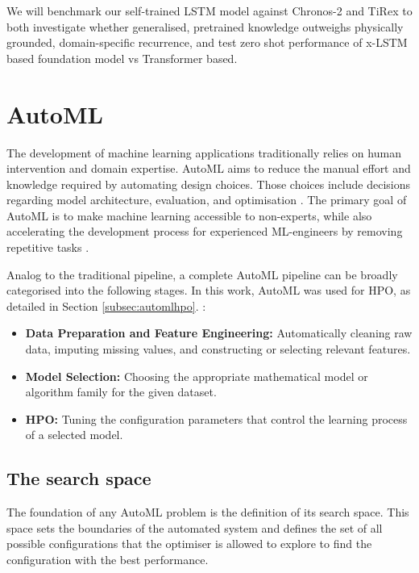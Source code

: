     
   We will benchmark our self-trained \ac{LSTM} model against Chronos-2 and TiRex to both investigate whether generalised, pretrained knowledge outweighs physically grounded, domain-specific recurrence, and test zero shot performance of \ac{x-LSTM} based foundation model vs Transformer based.
    

\section{AutoML}


The development of machine learning applications traditionally relies on human intervention and domain expertise. \ac{AutoML} aims to reduce the manual effort and knowledge required by automating design choices. Those choices include decisions regarding model architecture, evaluation, and optimisation \parencite{hutter2019automated}. The primary goal of \ac{AutoML} is to make machine learning accessible to non-experts, while also accelerating the development process for experienced ML-engineers by removing repetitive tasks \parencite{AutoMLHoos, hutter2019automated}.

Analog to the traditional pipeline, a complete \ac{AutoML} pipeline can be broadly categorised into the following stages. In this work, \ac{AutoML} was used for \ac{HPO}, as detailed in Section \ref{subsec:automlhpo}. 
:
\begin{itemize}
    \item \textbf{Data Preparation and Feature Engineering:} Automatically cleaning raw data, imputing missing values, and constructing or selecting relevant features.
    \item \textbf{Model Selection:} Choosing the appropriate mathematical model or algorithm family for the given dataset.
    \item \textbf{\ac{HPO}:} Tuning the configuration parameters that control the learning process of a selected model.
\end{itemize}

\subsection{The search space}
The foundation of any \ac{AutoML} problem is the definition of its search space. This space sets the boundaries of the automated system and defines the set of all possible configurations that the optimiser is allowed to explore to find the configuration with the best performance.

